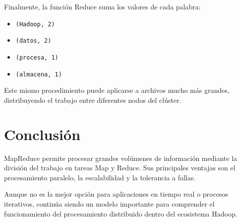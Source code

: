 Finalmente, la función Reduce suma los valores de cada palabra:

\begin{itemize}
    \item \texttt{(Hadoop, 2)}
    \item \texttt{(datos, 2)}
    \item \texttt{(procesa, 1)}
    \item \texttt{(almacena, 1)}
\end{itemize}

Este mismo procedimiento puede aplicarse a archivos mucho más grandes,
distribuyendo el trabajo entre diferentes nodos del clúster.

\section{Conclusión}

MapReduce permite procesar grandes volúmenes de información mediante la
división del trabajo en tareas Map y Reduce. Sus principales ventajas son el
procesamiento paralelo, la escalabilidad y la tolerancia a fallas.

Aunque no es la mejor opción para aplicaciones en tiempo real o procesos
iterativos, continúa siendo un modelo importante para comprender el
funcionamiento del procesamiento distribuido dentro del ecosistema Hadoop.